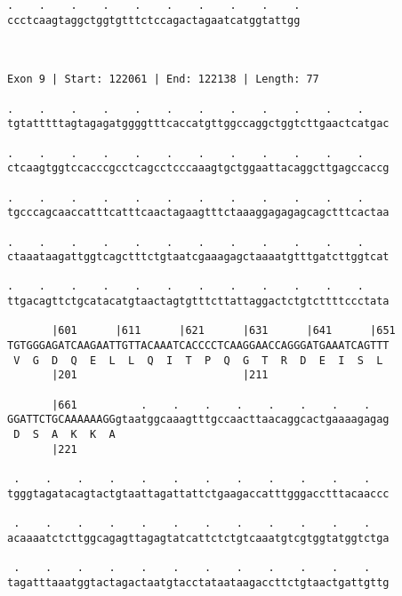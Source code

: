 \documentclass{article}
\begin{document}
\begin{Verbatim}
.    .    .    .    .    .    .    .    .    .
ccctcaagtaggctggtgtttctccagactagaatcatggtattgg
                                              
                                              
 
Exon 9 | Start: 122061 | End: 122138 | Length: 77
 
.    .    .    .    .    .    .    .    .    .    .    .    
tgtatttttagtagagatggggtttcaccatgttggccaggctggtcttgaactcatgac
                                                            
.    .    .    .    .    .    .    .    .    .    .    .    
ctcaagtggtccacccgcctcagcctcccaaagtgctggaattacaggcttgagccaccg
                                                            
.    .    .    .    .    .    .    .    .    .    .    .    
tgcccagcaaccatttcatttcaactagaagtttctaaaggagagagcagctttcactaa
                                                            
.    .    .    .    .    .    .    .    .    .    .    .    
ctaaataagattggtcagctttctgtaatcgaaagagctaaaatgtttgatcttggtcat
                                                            
.    .    .    .    .    .    .    .    .    .    .    .    
ttgacagttctgcatacatgtaactagtgtttcttattaggactctgtcttttccctata
                                                            
       |601      |611      |621      |631      |641      |651
TGTGGGAGATCAAGAATTGTTACAAATCACCCCTCAAGGAACCAGGGATGAAATCAGTTT
 V  G  D  Q  E  L  L  Q  I  T  P  Q  G  T  R  D  E  I  S  L 
       |201                          |211                   
  
       |661          .    .    .    .    .    .    .    .   
GGATTCTGCAAAAAAGGgtaatggcaaagtttgccaacttaacaggcactgaaaagagag
 D  S  A  K  K  A                                           
       |221                                                 
  
 .    .    .    .    .    .    .    .    .    .    .    .   
tgggtagatacagtactgtaattagattattctgaagaccatttgggacctttacaaccc
                                                            
 .    .    .    .    .    .    .    .    .    .    .    .   
acaaaatctcttggcagagttagagtatcattctctgtcaaatgtcgtggtatggtctga
                                                            
 .    .    .    .    .    .    .    .    .    .    .    .   
tagatttaaatggtactagactaatgtacctataataagaccttctgtaactgattgttg
                                                            

\end{Verbatim}
\end{document}
